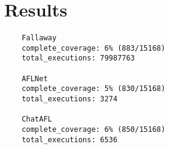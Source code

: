 \chapter{Results}
\label{chap:Results}

\begin{lstlisting}
    Fallaway
    complete_coverage: 6% (883/15168)
    total_executions: 79987763
    
    AFLNet
    complete_coverage: 5% (830/15168)
    total_executions: 3274
    
    ChatAFL
    complete_coverage: 6% (850/15168)
    total_executions: 6536    
\end{lstlisting}

